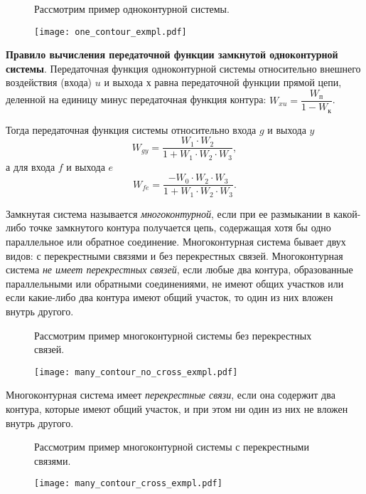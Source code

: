 \documentclass[../../TAU.tex]{subfiles}
\begin{document}
    \begin{figure}[h]
        \begin{minipage}[h]{0.29\linewidth}
            Рассмотрим пример одноконтурной системы.
            \vspace{3cm}
        \end{minipage}
        \begin{minipage}[h]{0.70\linewidth}
            \texttt{[image: one\_contour\_exmpl.pdf]}
        \end{minipage}
    \end{figure}
    {\bf Правило вычисления передаточной функции замкнутой одноконтурной системы}. 
    Передаточная функция одноконтурной системы относительно внешнего воздействия (входа) $u$ и выхода $х$ равна передаточной функции прямой цепи, деленной на единицу минус передаточная функция контура:
    $
        {W_{xu}=\dfrac{W_\text{п}}{1-W_\text{к}}}
    $.

    Тогда передаточная функция системы относительно входа $g$ и выхода $y$ 
    $$
        W_{gy}=\frac{W_1\cdot W_2}{1+W_1\cdot W_2\cdot W_3},
    $$
    а для входа $f$ и выхода $e$ 
    $$
        W_{fe}=\frac{-W_0\cdot W_2\cdot W_3}{1+W_1\cdot W_2\cdot W_3}.
    $$

     Замкнутая система называется {\it многоконтурной}, если при ее размыкании в какой-либо точке замкнутого контура получается цепь, содержащая хотя бы одно параллельное или обратное соединение. Многоконтурная система бывает двух видов: с перекрестными связями и без перекрестных связей.
    Многоконтурная система {\it не имеет перекрестных связей}, если любые два контура, образованные параллельными или обратными соединениями, не имеют общих участков или если какие-либо два контура имеют общий участок, то один из них вложен внутрь другого.
    \begin{figure}[h]
        \begin{minipage}[h]{0.19\linewidth}
            Рассмотрим пример многоконтурной системы без перекрестных связей.
            \vspace{3cm}
        \end{minipage}
        \begin{minipage}[h]{0.80\linewidth}
            \texttt{[image: many\_contour\_no\_cross\_exmpl.pdf]}
        \end{minipage}
    \end{figure}
    Многоконтурная система имеет {\it перекрестные связи}, если она содержит два контура, которые имеют общий участок, и при этом ни один из них не вложен внутрь другого.
    \begin{figure}[h]
        \begin{minipage}[h]{0.19\linewidth}
            Рассмотрим пример многоконтурной системы с перекрестными связями.
            \vspace{2cm}
        \end{minipage}
        \begin{minipage}[h]{0.80\linewidth}
            \texttt{[image: many\_contour\_cross\_exmpl.pdf]}
        \end{minipage}
    \end{figure}
\end{document}
